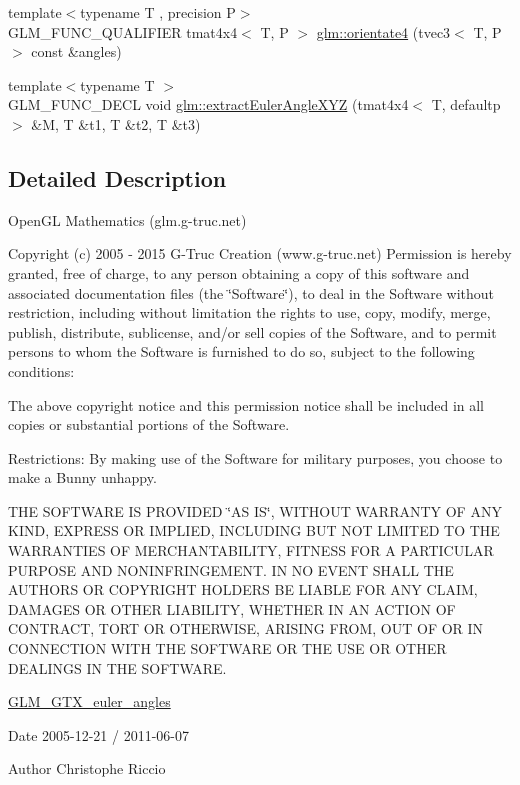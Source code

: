 \begin{DoxyCompactItemize}
\item 
{\footnotesize template$<$typename T , precision P$>$ }\\G\+L\+M\+\_\+\+F\+U\+N\+C\+\_\+\+Q\+U\+A\+L\+I\+F\+I\+E\+R tmat4x4$<$ T, P $>$ \hyperlink{group__gtx__euler__angles_ga4e25c9468b6f002c76e9a2412bcfa503}{glm\+::orientate4} (tvec3$<$ T, P $>$ const \&angles)
\item 
{\footnotesize template$<$typename T $>$ }\\G\+L\+M\+\_\+\+F\+U\+N\+C\+\_\+\+D\+E\+C\+L void \hyperlink{group__gtx__euler__angles_ga77ab6440250bd8b7e87a06c5643d6e74}{glm\+::extract\+Euler\+Angle\+X\+Y\+Z} (tmat4x4$<$ T, defaultp $>$ \&M, T \&t1, T \&t2, T \&t3)
\end{DoxyCompactItemize}


\subsection{Detailed Description}
Open\+G\+L Mathematics (glm.\+g-\/truc.\+net)

Copyright (c) 2005 -\/ 2015 G-\/\+Truc Creation (www.\+g-\/truc.\+net) Permission is hereby granted, free of charge, to any person obtaining a copy of this software and associated documentation files (the \char`\"{}\+Software\char`\"{}), to deal in the Software without restriction, including without limitation the rights to use, copy, modify, merge, publish, distribute, sublicense, and/or sell copies of the Software, and to permit persons to whom the Software is furnished to do so, subject to the following conditions\+:

The above copyright notice and this permission notice shall be included in all copies or substantial portions of the Software.

Restrictions\+: By making use of the Software for military purposes, you choose to make a Bunny unhappy.

T\+H\+E S\+O\+F\+T\+W\+A\+R\+E I\+S P\+R\+O\+V\+I\+D\+E\+D \char`\"{}\+A\+S I\+S\char`\"{}, W\+I\+T\+H\+O\+U\+T W\+A\+R\+R\+A\+N\+T\+Y O\+F A\+N\+Y K\+I\+N\+D, E\+X\+P\+R\+E\+S\+S O\+R I\+M\+P\+L\+I\+E\+D, I\+N\+C\+L\+U\+D\+I\+N\+G B\+U\+T N\+O\+T L\+I\+M\+I\+T\+E\+D T\+O T\+H\+E W\+A\+R\+R\+A\+N\+T\+I\+E\+S O\+F M\+E\+R\+C\+H\+A\+N\+T\+A\+B\+I\+L\+I\+T\+Y, F\+I\+T\+N\+E\+S\+S F\+O\+R A P\+A\+R\+T\+I\+C\+U\+L\+A\+R P\+U\+R\+P\+O\+S\+E A\+N\+D N\+O\+N\+I\+N\+F\+R\+I\+N\+G\+E\+M\+E\+N\+T. I\+N N\+O E\+V\+E\+N\+T S\+H\+A\+L\+L T\+H\+E A\+U\+T\+H\+O\+R\+S O\+R C\+O\+P\+Y\+R\+I\+G\+H\+T H\+O\+L\+D\+E\+R\+S B\+E L\+I\+A\+B\+L\+E F\+O\+R A\+N\+Y C\+L\+A\+I\+M, D\+A\+M\+A\+G\+E\+S O\+R O\+T\+H\+E\+R L\+I\+A\+B\+I\+L\+I\+T\+Y, W\+H\+E\+T\+H\+E\+R I\+N A\+N A\+C\+T\+I\+O\+N O\+F C\+O\+N\+T\+R\+A\+C\+T, T\+O\+R\+T O\+R O\+T\+H\+E\+R\+W\+I\+S\+E, A\+R\+I\+S\+I\+N\+G F\+R\+O\+M, O\+U\+T O\+F O\+R I\+N C\+O\+N\+N\+E\+C\+T\+I\+O\+N W\+I\+T\+H T\+H\+E S\+O\+F\+T\+W\+A\+R\+E O\+R T\+H\+E U\+S\+E O\+R O\+T\+H\+E\+R D\+E\+A\+L\+I\+N\+G\+S I\+N T\+H\+E S\+O\+F\+T\+W\+A\+R\+E.

\hyperlink{group__gtx__euler__angles}{G\+L\+M\+\_\+\+G\+T\+X\+\_\+euler\+\_\+angles}

\begin{DoxyDate}{Date}
2005-\/12-\/21 / 2011-\/06-\/07 
\end{DoxyDate}
\begin{DoxyAuthor}{Author}
Christophe Riccio 
\end{DoxyAuthor}
